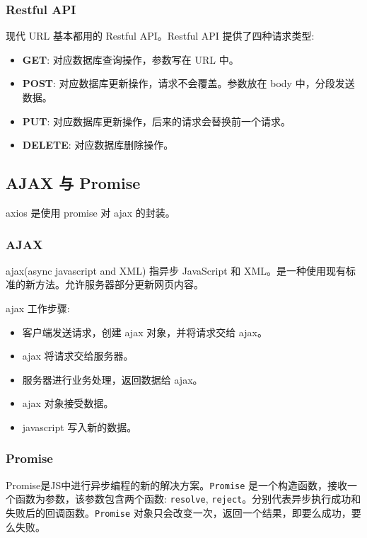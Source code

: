 \subsubsection*{Restful API}

现代 URL 基本都用的 Restful API。Restful API 提供了四种请求类型:
\begin{itemize}
  \item \textbf{GET}: 对应数据库查询操作，参数写在 URL 中。
  \item \textbf{POST}: 对应数据库更新操作，请求不会覆盖。参数放在 body 中，分段发送数据。
  \item \textbf{PUT}: 对应数据库更新操作，后来的请求会替换前一个请求。
  \item \textbf{DELETE}: 对应数据库删除操作。
\end{itemize}

\subsection{AJAX 与 Promise}

axios 是使用 promise 对 ajax 的封装。

\subsubsection*{AJAX}

ajax(async javascript and XML) 指异步 JavaScript 和 XML。是一种使用现有标准的新方法。允许服务器部分更新网页内容。

ajax 工作步骤:
\begin{itemize}
  \item 客户端发送请求，创建 ajax 对象，并将请求交给 ajax。
  \item ajax 将请求交给服务器。
  \item 服务器进行业务处理，返回数据给 ajax。
  \item ajax 对象接受数据。
  \item javascript 写入新的数据。
\end{itemize}

\subsubsection*{Promise}

Promise是JS中进行异步编程的新的解决方案。\texttt{Promise} 是一个构造函数，接收一个函数为参数，该参数包含两个函数: \texttt{resolve}, \texttt{reject}。分别代表异步执行成功和失败后的回调函数。\texttt{Promise} 对象只会改变一次，返回一个结果，即要么成功，要么失败。


